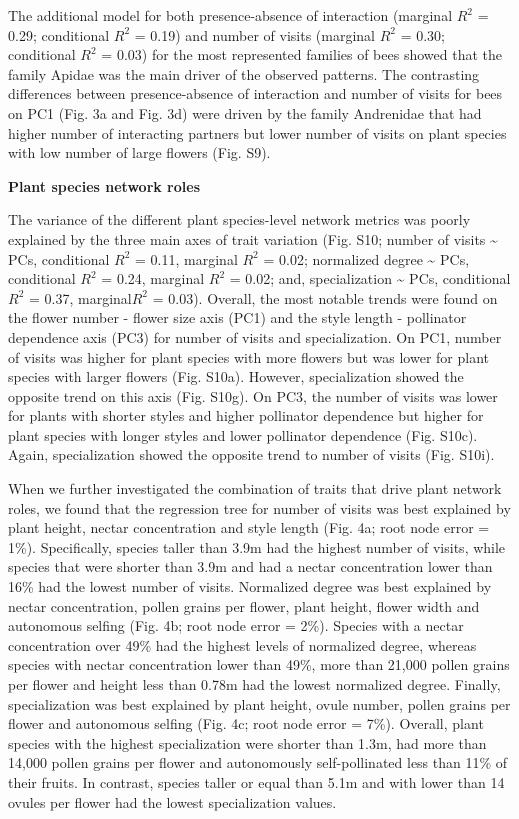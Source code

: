 \documentclass[
  12pt,
  a4paper,
]{article}
\begin{document}
The additional model for both presence-absence of interaction (marginal \(R^{2}\) = 0.29; conditional \(R^{2}\) = 0.19) and number of visits (marginal \(R^{2}\) = 0.30; conditional \(R^{2}\) = 0.03) for the most represented families of bees showed that the family Apidae was the main driver of the observed patterns. The contrasting differences between presence-absence of interaction and number of visits for bees on PC1 (Fig. 3a and Fig. 3d) were driven by the family Andrenidae that had higher number of interacting partners but lower number of visits on plant species with low number of large flowers (Fig. S9).

\textbf{Plant species network roles}

The variance of the different plant species-level network metrics was poorly explained by the three main axes of trait variation (Fig. S10; number of visits \textasciitilde{} PCs, conditional \(R^{2}\) = 0.11, marginal \(R^{2}\) = 0.02; normalized degree \textasciitilde{} PCs, conditional \(R^{2}\) = 0.24, marginal \(R^{2}\) = 0.02; and, specialization \textasciitilde{} PCs, conditional \(R^{2}\) = 0.37, marginal\(R^{2}\) = 0.03). Overall, the most notable trends were found on the flower number - flower size axis (PC1) and the style length - pollinator dependence axis (PC3) for number of visits and specialization. On PC1, number of visits was higher for plant species with more flowers but was lower for plant species with larger flowers (Fig. S10a). However, specialization showed the opposite trend on this axis (Fig. S10g). On PC3, the number of visits was lower for plants with shorter styles and higher pollinator dependence but higher for plant species with longer styles and lower pollinator dependence (Fig. S10c). Again, specialization showed the opposite trend to number of visits (Fig. S10i).

When we further investigated the combination of traits that drive plant network roles, we found that the regression tree for number of visits was best explained by plant height, nectar concentration and style length (Fig. 4a; root node error = 1\%). Specifically, species taller than 3.9m had the highest number of visits, while species that were shorter than 3.9m and had a nectar concentration lower than 16\% had the lowest number of visits. Normalized degree was best explained by nectar concentration, pollen grains per flower, plant height, flower width and autonomous selfing (Fig. 4b; root node error = 2\%). Species with a nectar concentration over 49\% had the highest levels of normalized degree, whereas species with nectar concentration lower than 49\%, more than 21,000 pollen grains per flower and height less than 0.78m had the lowest normalized degree. Finally, specialization was best explained by plant height, ovule number, pollen grains per flower and autonomous selfing (Fig. 4c; root node error = 7\%). Overall, plant species with the highest specialization were shorter than 1.3m, had more than 14,000 pollen grains per flower and autonomously self-pollinated less than 11\% of their fruits. In contrast, species taller or equal than 5.1m and with lower than 14 ovules per flower had the lowest specialization values.
\end{document}
